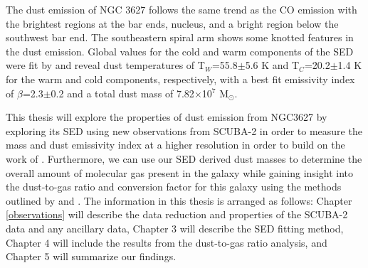 The dust emission of NGC 3627 follows the same trend as the CO emission with the brightest regions at the bar ends, nucleus, and a bright region below the southwest bar end.  The southeastern spiral arm shows some knotted features in the dust emission.  Global values for the cold and warm components of the SED were fit by \cite{galametz2012} and reveal dust temperatures of T$_W$=55.8$\pm$5.6 K and T$_C$=20.2$\pm$1.4 K for the warm and cold components, respectively, with a best fit emissivity index of $\beta$=2.3$\pm$0.2 and a total dust mass of 7.82$\times$10$^7$ M$_\odot$.

This thesis will explore the properties of dust emission from NGC3627 by exploring its SED using new observations from SCUBA-2 in order to measure the mass and dust emissivity index at a higher resolution in order to build on the work of \cite{galametz2012}.  Furthermore, we can use our SED derived dust masses to determine the overall amount of molecular gas present in the galaxy while gaining insight into the dust-to-gas ratio and conversion factor for this galaxy using the methods outlined by \cite{leroy2009} and \cite{sandstrom2013}.  The information in this thesis is arranged as follows: Chapter \ref{observations} will describe the data reduction and properties of the SCUBA-2 data and any ancillary data, Chapter 3 will describe the SED fitting method, Chapter 4 will include the results from the dust-to-gas ratio analysis, and Chapter 5 will summarize our findings.
